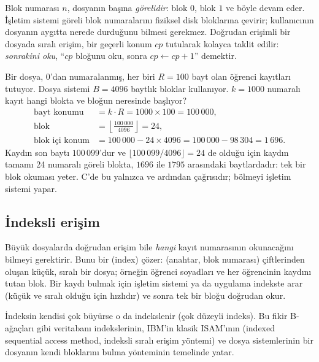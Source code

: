 Blok numarası $n$, dosyanın başına \emph{görelidir}: blok $0$, blok $1$ ve böyle devam eder. İşletim sistemi göreli blok numaralarını fiziksel disk bloklarına çevirir; kullanıcının dosyanın aygıtta nerede durduğunu bilmesi gerekmez. Doğrudan erişimli bir dosyada sıralı erişim, bir geçerli konum $cp$ tutularak kolayca taklit edilir: \emph{sonrakini oku}, ``$cp$ bloğunu oku, sonra $cp \leftarrow cp+1$'' demektir.

\begin{example}
Bir dosya, $0$'dan numaralanmış, her biri $R = 100$ bayt olan öğrenci kayıtları tutuyor. Dosya sistemi $B = 4096$ baytlık bloklar kullanıyor. $k = 1000$ numaralı kayıt hangi blokta ve bloğun neresinde başlıyor?
\begin{align*}
\text{bayt konumu} &= k \cdot R = 1000 \times 100 = 100\,000,\\
\text{blok} &= \left\lfloor \frac{100\,000}{4096} \right\rfloor = 24,\\
\text{blok içi konum} &= 100\,000 - 24 \times 4096 = 100\,000 - 98\,304 = 1\,696 .
\end{align*}
Kaydın son baytı $100\,099$'dur ve $\lfloor 100\,099 / 4096 \rfloor = 24$ de olduğu için kaydın tamamı 24 numaralı göreli blokta, $1696$ ile $1795$ arasındaki baytlardadır: tek bir blok okuması yeter. C'de bu yalnızca  ve ardından  çağrısıdır; bölmeyi işletim sistemi yapar.
\end{example}

\subsection{İndeksli erişim}

Büyük dosyalarda doğrudan erişim bile \emph{hangi} kayıt numarasının okunacağını bilmeyi gerektirir. Bunu bir  (index) çözer: (anahtar, blok numarası) çiftlerinden oluşan küçük, sıralı bir dosya; örneğin öğrenci soyadları ve her öğrencinin kaydını tutan blok. Bir kaydı bulmak için işletim sistemi ya da uygulama indekste arar (küçük ve sıralı olduğu için hızlıdır) ve sonra tek bir bloğu doğrudan okur.

İndeksin kendisi çok büyürse o da indekslenir (çok düzeyli indeks). Bu fikir B-ağaçları gibi veritabanı indekslerinin, IBM'in klasik ISAM'ının (indexed sequential access method, indeksli sıralı erişim yöntemi) ve dosya sistemlerinin bir dosyanın kendi bloklarını bulma yönteminin temelinde yatar.

